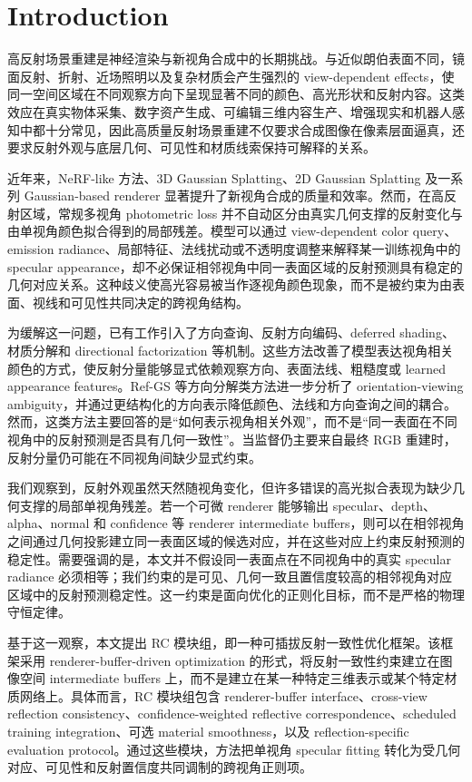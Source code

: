 \documentclass[UTF8,a4paper,11pt]{ctexart}
\begin{document}
\section{Introduction}

高反射场景重建是神经渲染与新视角合成中的长期挑战。与近似朗伯表面不同，镜面反射、折射、近场照明以及复杂材质会产生强烈的 view-dependent effects，使同一空间区域在不同观察方向下呈现显著不同的颜色、高光形状和反射内容。这类效应在真实物体采集、数字资产生成、可编辑三维内容生产、增强现实和机器人感知中都十分常见，因此高质量反射场景重建不仅要求合成图像在像素层面逼真，还要求反射外观与底层几何、可见性和材质线索保持可解释的关系。

近年来，NeRF-like 方法、3D Gaussian Splatting、2D Gaussian Splatting 及一系列 Gaussian-based renderer 显著提升了新视角合成的质量和效率。然而，在高反射区域，常规多视角 photometric loss 并不自动区分由真实几何支撑的反射变化与由单视角颜色拟合得到的局部残差。模型可以通过 view-dependent color query、emission radiance、局部特征、法线扰动或不透明度调整来解释某一训练视角中的 specular appearance，却不必保证相邻视角中同一表面区域的反射预测具有稳定的几何对应关系。这种歧义使高光容易被当作逐视角颜色现象，而不是被约束为由表面、视线和可见性共同决定的跨视角结构。

为缓解这一问题，已有工作引入了方向查询、反射方向编码、deferred shading、材质分解和 directional factorization 等机制。这些方法改善了模型表达视角相关颜色的方式，使反射分量能够显式依赖观察方向、表面法线、粗糙度或 learned appearance features。Ref-GS 等方向分解类方法进一步分析了 orientation-viewing ambiguity，并通过更结构化的方向表示降低颜色、法线和方向查询之间的耦合。然而，这类方法主要回答的是“如何表示视角相关外观”，而不是“同一表面在不同视角中的反射预测是否具有几何一致性”。当监督仍主要来自最终 RGB 重建时，反射分量仍可能在不同视角间缺少显式约束。

我们观察到，反射外观虽然天然随视角变化，但许多错误的高光拟合表现为缺少几何支撑的局部单视角残差。若一个可微 renderer 能够输出 specular、depth、alpha、normal 和 confidence 等 renderer intermediate buffers，则可以在相邻视角之间通过几何投影建立同一表面区域的候选对应，并在这些对应上约束反射预测的稳定性。需要强调的是，本文并不假设同一表面点在不同视角中的真实 specular radiance 必须相等；我们约束的是可见、几何一致且置信度较高的相邻视角对应区域中的反射预测稳定性。这一约束是面向优化的正则化目标，而不是严格的物理守恒定律。

基于这一观察，本文提出 RC 模块组，即一种可插拔反射一致性优化框架。该框架采用 renderer-buffer-driven optimization 的形式，将反射一致性约束建立在图像空间 intermediate buffers 上，而不是建立在某一种特定三维表示或某个特定材质网络上。具体而言，RC 模块组包含 renderer-buffer interface、cross-view reflection consistency、confidence-weighted reflective correspondence、scheduled training integration、可选 material smoothness，以及 reflection-specific evaluation protocol。通过这些模块，方法把单视角 specular fitting 转化为受几何对应、可见性和反射置信度共同调制的跨视角正则项。
\end{document}
